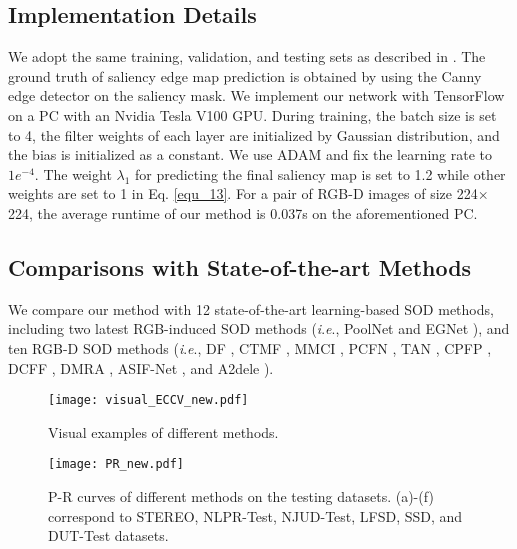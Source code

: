\documentclass[runningheads]{llncs}
\newcommand{\ie}{\textit{i}.\textit{e}.}
\begin{document}
\subsection{Implementation Details}
We adopt the same training, validation, and testing sets as described in \cite{DMRA,A2dele}. The ground truth of saliency edge map prediction is obtained by using the Canny edge detector on the saliency mask. We implement our network with TensorFlow on a PC with an Nvidia Tesla V100 GPU. During training, the batch size is set to 4, the filter weights of each layer are initialized by Gaussian distribution, and the bias is initialized as a constant. We use ADAM and fix the learning rate to $1e^{-4}$. The weight $\lambda_{1}$ for predicting the final saliency map is set to 1.2 while other weights are set to 1 in Eq. \eqref{equ_13}. For a pair of RGB-D images of size 224$\times$224, the average runtime of our method is 0.037s on the aforementioned PC.



\subsection{Comparisons with State-of-the-art Methods}
We compare our method with 12 state-of-the-art learning-based SOD methods, including two latest RGB-induced SOD methods (\ie, PoolNet \cite{PoolNet} and EGNet \cite{EGNet}), and ten RGB-D SOD methods (\ie, DF \cite{DF}, CTMF \cite{CTMF}, MMCI \cite{MMCI}, PCFN \cite{PCFN}, TAN \cite{TAN}, CPFP \cite{CPFP}, DCFF \cite{DCFF}, DMRA \cite{DMRA}, ASIF-Net \cite{ASIF-Net}, and A2dele \cite{A2dele}).

\begin{figure*}[!t]
	\centering
	\texttt{[image: visual\_ECCV\_new.pdf]}
	\caption{Visual examples of different methods.}
	\label{visual}
\end{figure*}

\begin{figure*}[!t]
	\centering
	\texttt{[image: PR\_new.pdf]}
	\caption{P-R curves of different methods on the testing datasets. (a)-(f) correspond to STEREO, NLPR-Test, NJUD-Test, LFSD, SSD, and DUT-Test datasets. }
	\label{PR}
\end{figure*}
\end{document}
